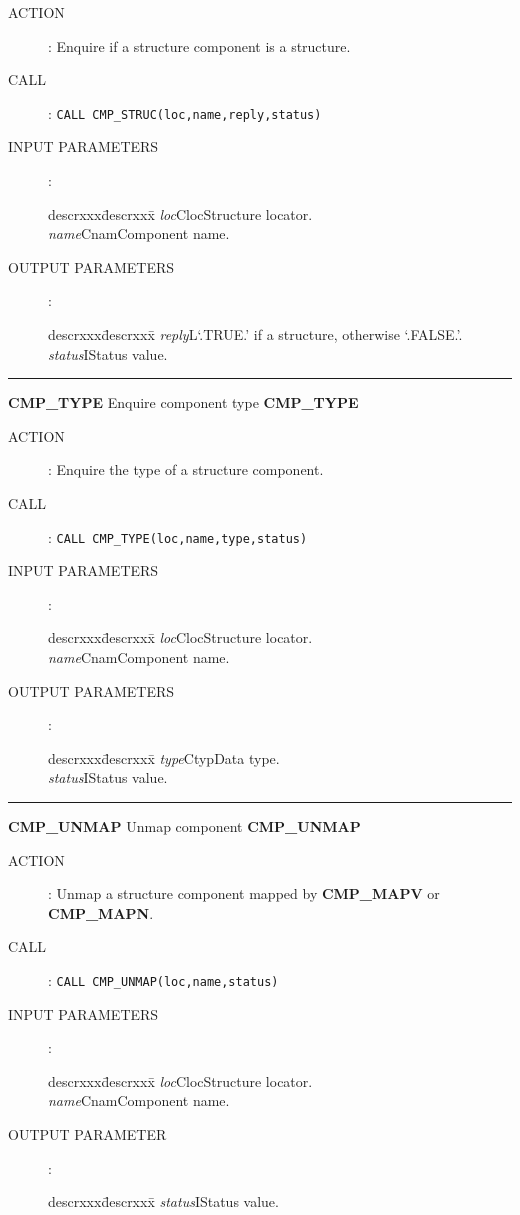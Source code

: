 \begin{description}
\item [ACTION]:
Enquire if a structure component is a structure.
\item [CALL]:
{\tt CALL CMP\_STRUC(loc,name,reply,status)}
\item [INPUT PARAMETERS]:
\begin{tabbing}
descrxxx\=descrxxx\=\kill
{\em loc}\>Cloc\>Structure locator.\\
{\em name}\>Cnam\>Component name.
\end{tabbing}
\item [OUTPUT PARAMETERS]:
\begin{tabbing}
descrxxx\=descrxxx\=\kill
{\em reply}\>L\>`.TRUE.' if a structure, otherwise `.FALSE.'.\\
{\em status}\>I\>Status value.
\end{tabbing}
\end{description}
\goodbreak
\rule{\textwidth}{0.3mm}
{\Large {\bf CMP\_TYPE} \hfill Enquire component type \hfill {\bf CMP\_TYPE}}
\begin{description}
\item [ACTION]:
Enquire the type of a structure component.
\item [CALL]:
{\tt CALL CMP\_TYPE(loc,name,type,status)}
\item [INPUT PARAMETERS]:
\begin{tabbing}
descrxxx\=descrxxx\=\kill
{\em loc}\>Cloc\>Structure locator.\\
{\em name}\>Cnam\>Component name.
\end{tabbing}
\item [OUTPUT PARAMETERS]:
\begin{tabbing}
descrxxx\=descrxxx\=\kill
{\em type}\>Ctyp\>Data type.\\
{\em status}\>I\>Status value.
\end{tabbing}
\end{description}
\goodbreak
\rule{\textwidth}{0.3mm}
{\Large {\bf CMP\_UNMAP} \hfill Unmap component \hfill {\bf CMP\_UNMAP}}
\begin{description}
\item [ACTION]:
Unmap a structure component mapped by {\bf CMP\_MAPV} or {\bf CMP\_MAPN}.
\item [CALL]:
{\tt CALL CMP\_UNMAP(loc,name,status)}
\item [INPUT PARAMETERS]:
\begin{tabbing}
descrxxx\=descrxxx\=\kill
{\em loc}\>Cloc\>Structure locator.\\
{\em name}\>Cnam\>Component name.
\end{tabbing}
\item [OUTPUT PARAMETER]:
\begin{tabbing}
descrxxx\=descrxxx\=\kill
{\em status}\>I\>Status value.
\end{tabbing}
\end{description}
